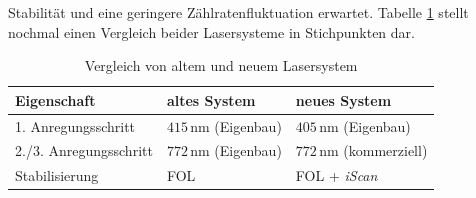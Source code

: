 Stabilität und eine geringere Zählratenfluktuation erwartet. Tabelle
\ref{tab:vergleich_alt_neu} stellt nochmal einen Vergleich beider Lasersysteme
in Stichpunkten dar.
\begin{table}
	\begin{tabular}{p{}|p{}p{}}
		\toprule
		Eigenschaft & altes System & neues System\\
		\midrule[1px]
		\hline
		1. Anregungsschritt & $415\,$nm (Eigenbau) & $405\,$nm (Eigenbau)\\
		2./3. Anregungsschritt & $772\,$nm (Eigenbau) & $772\,$nm (kommerziell)\\
		Stabilisierung & FOL & FOL +
		\textit{iScan}\\
		\bottomrule[1px]
	\end{tabular}
	\caption[Vergleich von altem und
	neuem Lasersystem]{Vergleich von altem und
	neuem Lasersystem}
	\label{tab:vergleich_alt_neu}
\end{table}
